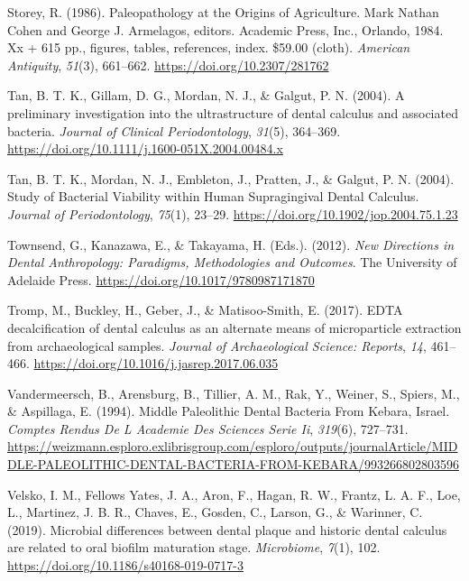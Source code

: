 \documentclass[
  letterpaper,
]{book}
\newlength{\cslhangindent}
\newlength{\cslentryspacingunit} %
\newenvironment{CSLReferences}[2] %
 {%
  \setlength{\parindent}{0pt}
  \ifodd #1
  \let\oldpar\par
  \def\par{\hangindent=\cslhangindent\oldpar}
  \fi
  \setlength{\parskip}{#2\cslentryspacingunit}
 }%
 {}
\begin{document}
\begin{CSLReferences}{1}{0}
\leavevmode{}%
Storey, R. (1986). Paleopathology at the {Origins} of {Agriculture}.
{Mark Nathan Cohen} and {George J}. {Armelagos}, editors. {Academic
Press}, {Inc}., {Orlando}, 1984. Xx + 615 pp., figures, tables,
references, index. \$59.00 (cloth). \emph{American Antiquity},
\emph{51}(3), 661--662. \url{https://doi.org/10.2307/281762}

\leavevmode{}%
Tan, B. T. K., Gillam, D. G., Mordan, N. J., \& Galgut, P. N. (2004). A
preliminary investigation into the ultrastructure of dental calculus and
associated bacteria. \emph{Journal of Clinical Periodontology},
\emph{31}(5), 364--369.
\url{https://doi.org/10.1111/j.1600-051X.2004.00484.x}

\leavevmode{}%
Tan, B. T. K., Mordan, N. J., Embleton, J., Pratten, J., \& Galgut, P.
N. (2004). Study of {Bacterial Viability} within {Human Supragingival
Dental Calculus}. \emph{Journal of Periodontology}, \emph{75}(1),
23--29. \url{https://doi.org/10.1902/jop.2004.75.1.23}

\leavevmode{}%
Townsend, G., Kanazawa, E., \& Takayama, H. (Eds.). (2012). \emph{New
{Directions} in {Dental Anthropology}: {Paradigms}, {Methodologies} and
{Outcomes}}. {The University of Adelaide Press}.
\url{https://doi.org/10.1017/9780987171870}

\leavevmode{}%
Tromp, M., Buckley, H., Geber, J., \& Matisoo-Smith, E. (2017). {EDTA}
decalcification of dental calculus as an alternate means of
microparticle extraction from archaeological samples. \emph{Journal of
Archaeological Science: Reports}, \emph{14}, 461--466.
\url{https://doi.org/10.1016/j.jasrep.2017.06.035}

\leavevmode{}%
Vandermeersch, B., Arensburg, B., Tillier, A. M., Rak, Y., Weiner, S.,
Spiers, M., \& Aspillaga, E. (1994). Middle {Paleolithic Dental Bacteria
From Kebara}, {Israel}. \emph{Comptes Rendus De L Academie Des Sciences
Serie Ii}, \emph{319}(6), 727--731.
\url{https://weizmann.esploro.exlibrisgroup.com/esploro/outputs/journalArticle/MIDDLE-PALEOLITHIC-DENTAL-BACTERIA-FROM-KEBARA/993266802803596}

\leavevmode{}%
Velsko, I. M., Fellows Yates, J. A., Aron, F., Hagan, R. W., Frantz, L.
A. F., Loe, L., Martinez, J. B. R., Chaves, E., Gosden, C., Larson, G.,
\& Warinner, C. (2019). Microbial differences between dental plaque and
historic dental calculus are related to oral biofilm maturation stage.
\emph{Microbiome}, \emph{7}(1), 102.
\url{https://doi.org/10.1186/s40168-019-0717-3}


\end{CSLReferences}
\end{document}

